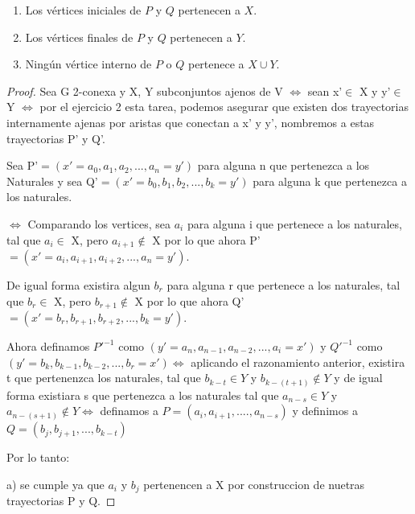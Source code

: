 \documentclass{article}
\begin{document}
\begin{enumerate}
            \begin{enumerate}
                \item Los v\'ertices iniciales de $P$ y $Q$ pertenecen a $X$.

                \item Los v\'ertices finales de $P$ y $Q$ pertenecen a $Y$.

                \item Ning\'un v\'ertice interno de $P$ o $Q$ pertenece a $X \cup Y$.
            \end{enumerate}

            \renewcommand\qedsymbol{QED}
            \begin{proof}
                Sea G 2-conexa y X, Y subconjuntos ajenos de V $\Leftrightarrow$ sean x'$\in$ X y y'$\in$ Y $\Leftrightarrow$ por el ejercicio 2 esta tarea, podemos asegurar que existen dos trayectorias internamente ajenas por aristas que conectan a x' y y', nombremos a estas trayectorias P' y Q'.

                Sea P'$=(x'=a_0, a_1, a_2, ..., a_n = y')$ para alguna n que pertenezca a los Naturales y sea  Q'$=(x' =b_0, b_1, b_2, ..., b_k = y')$ para alguna k que pertenezca a los naturales.

                $\Leftrightarrow$ Comparando los vertices, sea $a_i$ para alguna i que pertenece a los naturales, tal que  $a_i \in$ X, pero  $a_{i+1} \notin$ X por lo que ahora P'$=(x'=a_i, a_{i+1}, a_{i+2}, ..., a_n = y')$.

                De igual forma existira algun $b_r$ para alguna r que pertenece a los naturales, tal que $b_r \in$ X, pero $b_{r+1} \notin $ X por lo que ahora  Q'$=(x' =b_r, b_{r+1}, b_{r+2}, ..., b_k = y')$.

                Ahora definamos $P'^{-1}$ como $(y'=a_n, a_{n-1}, a_{n-2}, ..., a_i=x')$ y $Q'^{-1}$ como $(y'=b_k, b_{k-1}, b_{k-2}, ..., b_r=x') \Leftrightarrow$ aplicando el razonamiento anterior,  existira t que pertenenzca los naturales, tal que $b_{k-t} \in Y$ y $b_{k-(t+1)} \notin Y$  y de igual forma existiara s que pertenezca a los naturales tal que $a_{n-s} \in Y$ y  $a_{n-(s+1)} \notin Y \Leftrightarrow$ definamos a $P=(a_i, a_{i+1}, ...., a_{n-s})$ y definimos a $Q=(b_j, b_{j+1}, ..., b_{k-t})$

                Por lo tanto:

                a) se cumple ya que $a_i$ y $b_j$ pertenencen a X por construccion de nuetras trayectorias P y Q.


\end{proof}
\end{enumerate}
\end{document}
